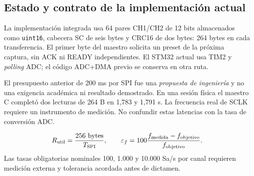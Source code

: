 \documentclass[11pt,a4paper]{article}
\begin{document}
\subsection{Estado y contrato de la implementación actual}
La implementación integrada usa 64 pares CH1/CH2 de 12 bits almacenados como
\texttt{uint16}, cabecera SC de seis bytes y CRC16 de dos bytes: 264 bytes en
cada transferencia. El primer byte del maestro solicita un preset de la próxima
captura, sin ACK ni READY independientes. El STM32 actual usa TIM2 y
\emph{polling} ADC; el código ADC+DMA previo se conserva en otra ruta.

El presupuesto anterior de 200 ms por SPI fue una \emph{propuesta de ingeniería}
y no una exigencia académica ni resultado demostrado. En una sesión física el
maestro C completó dos lecturas de 264 B en 1,783 y 1,791 s. La
frecuencia real de SCLK requiere un instrumento de medición. No confundir estas
latencias con la tasa de conversión ADC.

\[
  R_{\rm util} = \frac{256\ \mathrm{bytes}}{T_{\rm SPI}},
  \qquad
  \varepsilon_{f} = 100\frac{f_{\rm medida}-f_{\rm objetivo}}{f_{\rm objetivo}}.
\]
Las tasas obligatorias nominales 100, 1.000 y 10.000 Sa/s por canal requieren
medición externa y tolerancia acordada antes de dictamen.
\end{document}
